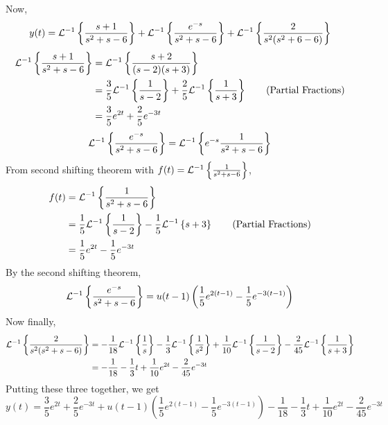 \documentclass[openany]{report}
\begin{document}
Now, 
\[y(t) = \mathcal{L}^{-1}\left\{\frac{s+1}{s^2+s-6}\right\} + \mathcal{L}^{-1}\left\{\frac{e^{-s}}{s^2+s-6}\right\} + \mathcal{L}^{-1}\left\{\frac{2}{s^2(s^2+6-6)}\right\}\]
\begin{align*}
    \mathcal{L}^{-1}\left\{\frac{s+1}{s^2+s-6}\right\} &= \mathcal{L}^{-1}\left\{\frac{s+2}{(s-2)(s+3)}\right\}\\
    &= \frac{3}{5}\mathcal{L}^{-1}\left\{\frac{1}{s-2}\right\} + \frac{2}{5}\mathcal{L}^{-1}\left\{\frac{1}{s+3}\right\}\tag{Partial Fractions}\\
    &= \frac{3}{5}e^{2t} + \frac{2}{5}e^{-3t}\\
\end{align*}
\[
    \mathcal{L}^{-1}\left\{\frac{e^{-s}}{s^2+s-6}\right\} = \mathcal{L}^{-1}\left\{e^{-s}\frac{1}{s^2+s-6}\right\}
\]
From second shifting theorem with $f(t) = \mathcal{L}^{-1}\left\{\frac{1}{s^2+s-6}\right\}$,
\begin{align*}
    f(t) &= \mathcal{L}^{-1}\left\{\frac{1}{s^2+s-6}\right\}\\
    &= \frac{1}{5}\mathcal{L}^{-1}\left\{\frac{1}{s-2}\right\} - \frac{1}{5}\mathcal{L}^{-1}\left\{s+3\right\}\tag{Partial Fractions}\\
    &= \frac{1}{5}e^{2t} - \frac{1}{5}e^{-3t}
\end{align*}
By the second shifting theorem, 
\[\mathcal{L}^{-1}\left\{\frac{e^{-s}}{s^2+s-6}\right\} = u(t-1)\left(\frac{1}{5}e^{2(t-1)} - \frac{1}{5}e^{-3(t-1)}\right)\]
Now finally, 
\begin{align*}
    \mathcal{L}^{-1}\left\{\frac{2}{s^2(s^2+s-6)}\right\} &=  -\frac{1}{18}\mathcal{L}^{-1}\left\{\frac{1}{s}\right\} - \frac{1}{3}\mathcal{L}^{-1}\left\{\frac{1}{s^2}\right\} + \frac{1}{10}\mathcal{L}^{-1}\left\{\frac{1}{s-2}\right\} - \frac{2}{45}\mathcal{L}^{-1}\left\{\frac{1}{s+3}\right\}\\
    &= -\frac{1}{18} - \frac{1}{3}t + \frac{1}{10}e^{2t} - \frac{2}{45}e^{-3t}\\
\end{align*}
Putting these three together, we get 
\[y(t) = \frac{3}{5}e^{2t} + \frac{2}{5}e^{-3t} + u(t-1)\left(\frac{1}{5}e^{2(t-1)} - \frac{1}{5}e^{-3(t-1)}\right) -\frac{1}{18} - \frac{1}{3}t + \frac{1}{10}e^{2t} - \frac{2}{45}e^{-3t}\]
\end{document}
